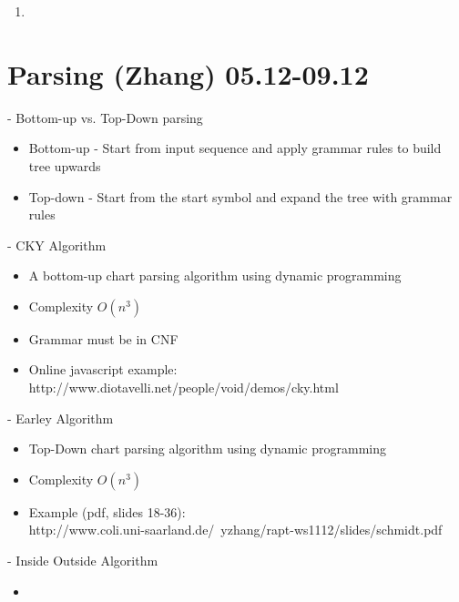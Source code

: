 \documentclass[11pt]{article}
\begin{document}
\begin{enumerate}
 \item
\end{enumerate}


%
%
\section{Parsing (Zhang) 05.12-09.12}

- Bottom-up vs. Top-Down parsing
\begin{itemize}
 \item Bottom-up - Start from input sequence and apply grammar rules to build tree upwards
 \item Top-down - Start from the start symbol and expand the tree with grammar rules
\end{itemize}
- CKY Algorithm
\begin{itemize}
 \item A bottom-up chart parsing algorithm using dynamic programming
 \item Complexity $O(n^3)$ 
 \item Grammar must be in CNF
 \item Online javascript example: http://www.diotavelli.net/people/void/demos/cky.html
\end{itemize}
- Earley Algorithm
\begin{itemize}
 \item Top-Down chart parsing algorithm using dynamic programming
 \item Complexity $O(n^3)$
 \item Example (pdf, slides 18-36): \\http://www.coli.uni-saarland.de/~yzhang/rapt-ws1112/slides/schmidt.pdf
\end{itemize}
- Inside Outside Algorithm
\begin{itemize}
 \item 
\end{itemize}
\end{document}
